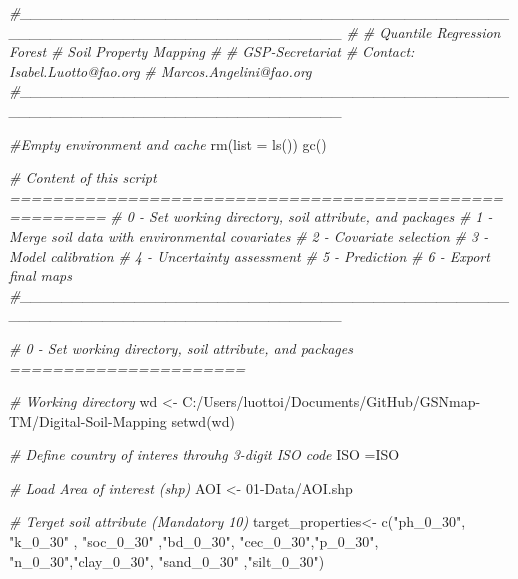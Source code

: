 \documentclass[
  10pt,
  b5paper,
  oneside]{book}
\newenvironment{Shaded}{\begin{snugshade}}{\end{snugshade}}
\newcommand{\AttributeTok}[1]{\textcolor[rgb]{0.77,0.63,0.00}{#1}}
\newcommand{\CommentTok}[1]{\textcolor[rgb]{0.56,0.35,0.01}{\textit{#1}}}
\newcommand{\FunctionTok}[1]{\textcolor[rgb]{0.00,0.00,0.00}{#1}}
\newcommand{\NormalTok}[1]{#1}
\newcommand{\OtherTok}[1]{\textcolor[rgb]{0.56,0.35,0.01}{#1}}
\newcommand{\StringTok}[1]{\textcolor[rgb]{0.31,0.60,0.02}{#1}}
\begin{document}
\begin{Shaded}
\begin{Highlighting}[]
\CommentTok{\#\_\_\_\_\_\_\_\_\_\_\_\_\_\_\_\_\_\_\_\_\_\_\_\_\_\_\_\_\_\_\_\_\_\_\_\_\_\_\_\_\_\_\_\_\_\_\_\_\_\_\_\_\_\_\_\_\_\_\_\_\_\_\_\_\_\_\_\_\_\_\_\_\_\_\_\_\_\_\_}
\CommentTok{\#}
\CommentTok{\# Quantile Regression Forest}
\CommentTok{\# Soil Property Mapping}
\CommentTok{\#}
\CommentTok{\# GSP{-}Secretariat}
\CommentTok{\# Contact: Isabel.Luotto@fao.org}
\CommentTok{\#          Marcos.Angelini@fao.org}
\CommentTok{\#\_\_\_\_\_\_\_\_\_\_\_\_\_\_\_\_\_\_\_\_\_\_\_\_\_\_\_\_\_\_\_\_\_\_\_\_\_\_\_\_\_\_\_\_\_\_\_\_\_\_\_\_\_\_\_\_\_\_\_\_\_\_\_\_\_\_\_\_\_\_\_\_\_\_\_\_\_\_\_}

\CommentTok{\#Empty environment and cache }
\FunctionTok{rm}\NormalTok{(}\AttributeTok{list =} \FunctionTok{ls}\NormalTok{())}
\FunctionTok{gc}\NormalTok{()}

\CommentTok{\# Content of this script =======================================================}
\CommentTok{\# 0 {-} Set working directory, soil attribute, and packages}
\CommentTok{\# 1 {-} Merge soil data with environmental covariates }
\CommentTok{\# 2 {-} Covariate selection}
\CommentTok{\# 3 {-} Model calibration}
\CommentTok{\# 4 {-} Uncertainty assessment}
\CommentTok{\# 5 {-} Prediction}
\CommentTok{\# 6 {-} Export final maps}
\CommentTok{\#\_\_\_\_\_\_\_\_\_\_\_\_\_\_\_\_\_\_\_\_\_\_\_\_\_\_\_\_\_\_\_\_\_\_\_\_\_\_\_\_\_\_\_\_\_\_\_\_\_\_\_\_\_\_\_\_\_\_\_\_\_\_\_\_\_\_\_\_\_\_\_\_\_\_\_\_\_\_\_}


\CommentTok{\# 0 {-} Set working directory, soil attribute, and packages ======================}

\CommentTok{\# Working directory}
\NormalTok{wd }\OtherTok{\textless{}{-}} \StringTok{\textquotesingle{}C:/Users/luottoi/Documents/GitHub/GSNmap{-}TM/Digital{-}Soil{-}Mapping\textquotesingle{}}
\FunctionTok{setwd}\NormalTok{(wd)}

\CommentTok{\# Define country of interes throuhg 3{-}digit ISO code}
\NormalTok{ISO }\OtherTok{=}\StringTok{\textquotesingle{}ISO\textquotesingle{}}

\CommentTok{\# Load Area of interest (shp)}
\NormalTok{AOI }\OtherTok{\textless{}{-}} \StringTok{\textquotesingle{}01{-}Data/AOI.shp\textquotesingle{}}

\CommentTok{\# Terget soil attribute (Mandatory 10)}
\NormalTok{target\_properties}\OtherTok{\textless{}{-}} \FunctionTok{c}\NormalTok{(}\StringTok{"ph\_0\_30"}\NormalTok{, }\StringTok{"k\_0\_30"}\NormalTok{ , }\StringTok{"soc\_0\_30"}\NormalTok{ ,}\StringTok{"bd\_0\_30"}\NormalTok{, }\StringTok{"cec\_0\_30"}\NormalTok{,}\StringTok{"p\_0\_30"}\NormalTok{,   }
                      \StringTok{"n\_0\_30"}\NormalTok{,}\StringTok{"clay\_0\_30"}\NormalTok{, }\StringTok{"sand\_0\_30"}\NormalTok{ ,}\StringTok{"silt\_0\_30"}\NormalTok{)}


\end{Highlighting}
\end{Shaded}
\end{document}
